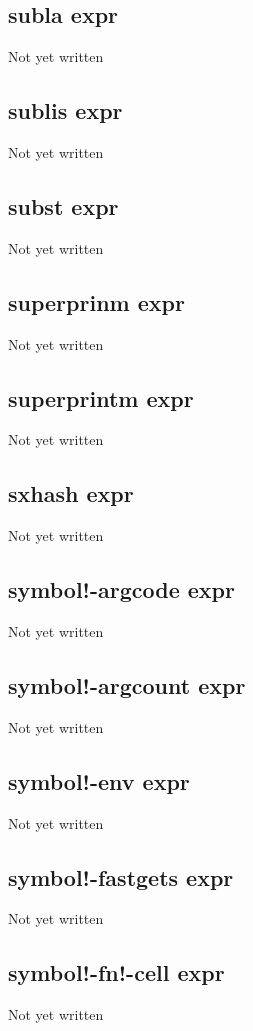 \documentclass[a4paper,11pt]{article}
\begin{document}
\subsection{\ttfamily subla expr}
Not yet written

\subsection{\ttfamily sublis expr}
Not yet written

\subsection{\ttfamily subst expr}
Not yet written

\subsection{\ttfamily superprinm expr}
Not yet written

\subsection{\ttfamily superprintm expr}
Not yet written

\subsection{\ttfamily sxhash expr}
Not yet written

\subsection{\ttfamily symbol!-argcode expr}
Not yet written

\subsection{\ttfamily symbol!-argcount expr}
Not yet written

\subsection{\ttfamily symbol!-env expr}
Not yet written

\subsection{\ttfamily symbol!-fastgets expr}
Not yet written

\subsection{\ttfamily symbol!-fn!-cell expr}
Not yet written
\end{document}
